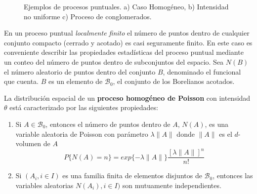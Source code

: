 \begin{figure}
	\centering
{}
\hfill
{}
\hfill
{}
	\caption{Ejemplos de procesos puntuales. a) Caso Homog\'eneo, b) Intensidad no uniforme c) Proceso de conglomerados.}
	\label{f:pointProc}
\end{figure}



En un proceso puntual \textit{localmente finito} el n\'umero de puntos dentro de cualquier conjunto compacto (cerrado y acotado) es casi seguramente finito.
En este caso es conveniente describir las propiedades estad\'isticas del proceso puntual mediante un conteo del n\'umero de puntos dentro de subconjuntos del espacio.
Sea $N(B)$ el n\'umero aleatorio de puntos dentro del conjunto $B$, denominado el funcional que cuenta. $B$ es un elemento de $\mathcal{B}_0$, el conjunto de los Borelianos acotados.

La distribuci\'on espacial de un \textbf{proceso homog\'eneo de Poisson} con intensidad $\theta$ est\'a caracterizado por las siguientes propiedades:

\begin{enumerate}
	\item Si $A \in \mathcal{B}_0$, entonces el n\'umero de puntos dentro de $A$, $N(A)$, es una variable aleatoria de Poisson con par\'ametro $\lambda \|A\|$ donde $\|A\|$ es el $d$-volumen de $A$
		\begin{equation*}
			P\{N(A) = n\} =
			exp\{-\lambda \|A\|\}
			\frac{[\lambda \|A\|]^n}{n!}
		\end{equation*}
	\item Si $(A_i, i \in I)$ es una familia finita de elementos disjuntos de $\mathcal{B}_0$, entonces las variables aleatorias $N(A_i), i \in I)$ son mutuamente independientes.
\end{enumerate}

